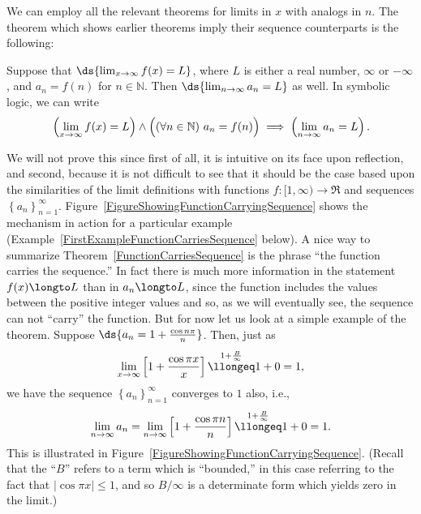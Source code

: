 We can employ all the relevant theorems 
for limits in $x$ with analogs in $n$.  The theorem which 
shows earlier theorems imply their sequence counterparts is
the following:
\begin{theorem}Suppose that $\ds{\lim_{x\to\infty}f(x)=L}$,
where $L$ is either a real number, $\infty$ or $-\infty$, 
and $a_n=f(n)$ for $n\in\mathbb{N}$.  Then
$\ds{\lim_{n\to\infty}a_n=L}$ as well.  In symbolic logic,
we can write
\begin{equation}
\left(\lim_{x\to\infty}f(x)=L\right)
\wedge
\left(\vphantom{\lim_{x\to\infty}}(\forall n\in\mathbb{N})\ a_n=f(n)\right)
\implies \left(\lim_{n\to\infty}a_n=L\right).
\label{FunctionCarriesSequence}\end{equation}
\label{FunctionCarriesSequenceTheorem}\end{theorem}
We will not prove this since first of all, it is intuitive on its face
upon reflection, and second, because it is not difficult to
see that it should be the case based upon the similarities 
of the limit definitions with functions $f:[1,\infty)\longrightarrow\Re$
and sequences $\left\{a_n\right\}_{n=1}^\infty$.
Figure~\ref{FigureShowingFunctionCarryingSequence}
shows the mechanism in action for a particular example
(Example~\ref{FirstExampleFunctionCarriesSequence}  below).
A nice way to summarize Theorem~\ref{FunctionCarriesSequence}
is the phrase ``the function carries the sequence.'' 
In fact there is much more information in the statement
$f(x)\longto L$ than in $a_n\longto L$, since the
function includes the values between the positive
integer values and so, as we will eventually see,
the sequence can not ``carry'' the function.  But for now
let us look at a simple example of the theorem.
\bex Suppose $\ds{a_n=1+\frac{\cos n\pi}{n}}$.  Then,
just as 
$$\lim_{x\to\infty}\left[1+\frac{\cos \pi x}{x}\right]
\overset{1+\frac{B}\infty}{\llongeq}1+0=1,$$
we have the sequence $\left\{a_n\right\}_{n=1}^\infty$
converges to $1$ also, i.e.,
$$\lim_{n\to\infty}a_n=\lim_{n\to\infty}
 \left[1+\frac{\cos\pi n}{n}\right]
\overset{1+\frac{B}\infty}{\llongeq}1+0=1.$$
This is illustrated in Figure~\ref{FigureShowingFunctionCarryingSequence}.
(Recall that the ``$B$'' refers to a term which is ``bounded,''
in this case referring to the fact that $|\cos\pi x|\le 1$,
and so $B/\infty$ is a determinate form which yields zero in the
limit.)
\label{FirstExampleFunctionCarriesSequence}
\eex

